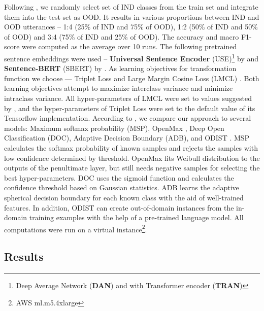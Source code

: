 \documentclass[runningheads]{llncs}
\begin{document}
Following \cite{zhang2021adaptive_decision_boundary}, we randomly select set of IND classes from the train set and integrate them into the test set as OOD. It results in various proportions between IND and OOD utterances -- 1:4 (25\% of IND and 75\% of OOD), 1:2 (50\% of IND and 50\% of OOD) and 3:4 (75\% of IND and 25\% of OOD). The accuracy and macro F1-score were computed as the average over 10 runs. 
The following pretrained sentence embeddings were used -- \textbf{Universal Sentence Encoder} (USE)\footnote{Deep Average Network (\textbf{DAN}) and with Transformer encoder (\textbf{TRAN})} by \cite{cer2018universal_sentence_encoder} and \textbf{Sentence-BERT} (SBERT) by \cite{reimers2019sentencebert}. 
As learning objectives for transformation function  we choose --- Triplet Loss \cite{hoffer2018deep_triplet_loss} and Large Margin Cosine Loss (LMCL) \cite{wang2018cosface}. Both learning objectives attempt to maximize interclass variance and minimize intraclass variance. All hyper-parameters of LMCL were set to values suggested by \cite{wang2018cosface}, and the hyper-parameters of Triplet Loss were set to the default value of its Tensorflow implementation. According to \cite{zhang2021adaptive_decision_boundary}, we compare our approach to several models: Maximum softmax probability \cite{baseline_msp} (MSP), OpenMax \cite{openMax}, Deep Open Classification \cite{shu2017doc} (DOC), Adaptive Decision Boundary \cite{zhang2021adaptive_decision_boundary} (ADB), and ODIST \cite{odist}. MSP calculates the softmax probability of known samples and rejects the samples with low confidence determined by threshold. OpenMax fits Weibull distribution to the outputs of the penultimate layer, but still needs negative samples for selecting the best hyper-parameters. DOC uses the sigmoid function and calculates the confidence threshold based on Gaussian statistics. ADB learns the adaptive spherical decision boundary for each known class with the aid of well-trained features. In addition, ODIST can create out-of-domain instances from the in-domain training examples with the help of a pre-trained language model. All computations were run on a virtual instance\footnote{AWS ml.m5.4xlarge}.









\subsection{Results}
\end{document}
